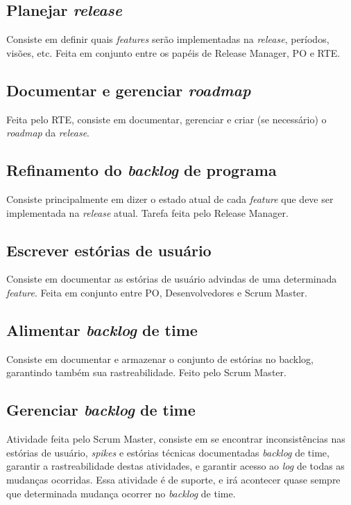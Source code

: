 \subsection{Planejar \emph{release}}
Consiste em definir quais \emph{features} serão implementadas na \emph{release}, períodos, visões, etc. Feita em conjunto entre os papéis de Release Manager, PO e RTE.

\subsection{Documentar e gerenciar \emph{roadmap}}
Feita pelo RTE, consiste em documentar, gerenciar e criar (se necessário) o \emph{roadmap} da \emph{release}.

\subsection{Refinamento do \emph{backlog} de programa}
Consiste principalmente em dizer o estado atual de cada \emph{feature} que deve ser implementada na \emph{release} atual. Tarefa feita pelo Release Manager.

\subsection{Escrever estórias de usuário}
Consiste em documentar as estórias de usuário advindas de uma determinada \emph{feature}. Feita em conjunto entre PO, Desenvolvedores e Scrum Master.

\subsection{Alimentar \emph{backlog} de time}
Consiste em documentar e armazenar o conjunto de estórias no backlog, garantindo também sua rastreabilidade. Feito pelo Scrum Master.

\subsection{Gerenciar \emph{backlog} de time}
Atividade feita pelo Scrum Master, consiste em se encontrar inconsistências nas estórias de usuário, \emph{spikes} e estórias técnicas documentadas \emph{backlog} de time, garantir a rastreabilidade destas atividades, e garantir acesso ao \emph{log} de todas as mudanças ocorridas. Essa atividade é de suporte, e irá acontecer quase sempre que determinada mudança ocorrer no \emph{backlog} de time.

